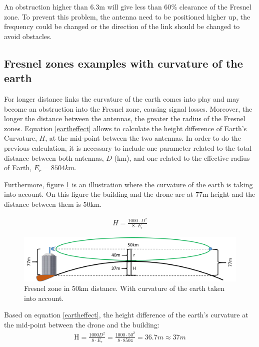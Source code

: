 An obstruction higher than 6.3m will give less than 60$\%$ clearance of the Fresnel zone. To prevent this problem, the antenna need to be positioned higher up, the frequency could be changed or the direction of the link should be changed to avoid obstacles.

\subsection{Fresnel zones examples with curvature of the earth}
For longer distance links the curvature of the earth comes into play and may become an obstruction into the Fresnel zone, causing signal losses. Moreover, the longer the distance between the antennas, the greater the radius of the Fresnel zones. Equation \ref{eartheffect} allows to calculate the height difference of Earth's Curvature, $H$, at the mid-point between the two antennas. In order to do the previous calculation, it is necessary to include one parameter related to the total distance between both antennas, $D$ (km), and one related to the effective radius of Earth, $E_r = 8 504 km$.

Furthermore, figure \ref{fig:fresnel_50km_curvature} is an illustration where the curvature of the earth is taking into account. On this figure the building and the drone are at 77m height and the distance between them is 50km. 

\begin{align}
H = \frac{1000\cdot D^2}{8\cdot E_r}\label{eartheffect}
\end{align}

\begin{figure}[H]
	\centering
	\includegraphics[scale=0.50]{figures/fresnel_50km_curvature.png}
	\caption{Fresnel zone in 50km distance. With curvature of the earth taken into account.}
	\label{fig:fresnel_50km_curvature}
\end{figure}

Based on equation \ref{eartheffect}, the height difference of the earth's curvature at the mid-point between the drone and the building:
\begin{align}
\text{H} = \frac{1000 D^2}{8 \cdot E_r} = \frac{1000 \cdot 50^2}{8\cdot 8504} = 36.7m \approx 37m 
\end{align}

